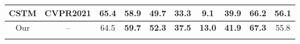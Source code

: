 \documentclass[10pt,twocolumn,letterpaper]{article}
\begin{document}
\begin{table*}[t!]
\begin{tabular}{cccc|cc|ccccc|c|cc|}
		
		\multicolumn{4}{|c|}{CSTM \cite{hui2021collaborative}}                        & \multicolumn{2}{c|}{CVPR2021}      & \multicolumn{1}{c|}{\textbf{65.4}}  & \multicolumn{1}{c|}{58.9}  & \multicolumn{1}{c|}{49.7} & \multicolumn{1}{c|}{33.3} & \multicolumn{1}{c|}{9.1} & 39.9 & \multicolumn{1}{c|}{66.2} & \multicolumn{1}{c|}{\textbf{56.1}} \\\hline
		
		
	    \multicolumn{4}{|c|}{Our }                        & \multicolumn{2}{c|}{--}       & \multicolumn{1}{c|}{64.5}      & \multicolumn{1}{c|}{\textbf{59.7}}      & \multicolumn{1}{c|}{\textbf{52.3}}     & \multicolumn{1}{c|}{\textbf{37.5}}     & \multicolumn{1}{c|}{\textbf{13.0}} & \multicolumn{1}{c|}{\textbf{41.9}} & \multicolumn{1}{c|}{\textbf{67.3}} & \multicolumn{1}{c|}{55.8}  \\ \hline
\vspace{-6mm}
	\end{tabular}
	\label{A2D}
\end{table*}
\end{document}
